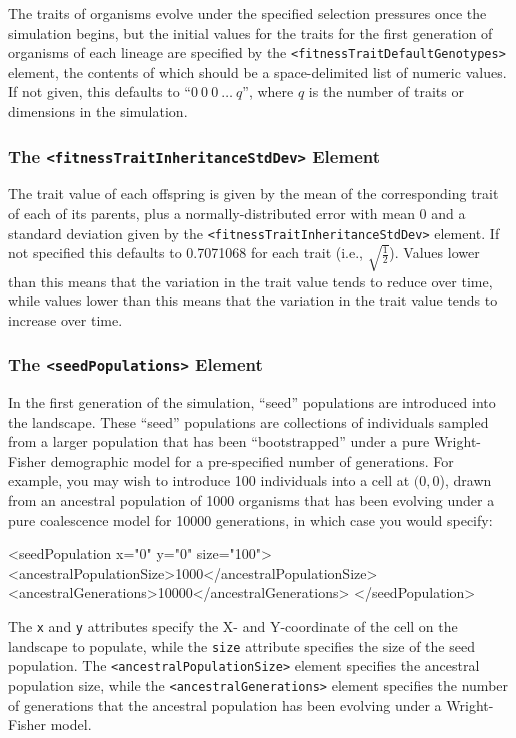 \documentclass[11pt]{article}
\newcommand{\xmlelem}[1]{{\tt<\textcolor{xmlelem}{#1}>}}
\newcommand{\xmlattr}[1]{{\tt\textcolor{xmlattr}{#1}}}
\begin{document}
The traits of organisms evolve under the specified selection pressures once the simulation begins, but the initial values for the traits for the first generation of organisms of each lineage are specified by the \xmlelem{fitnessTraitDefaultGenotypes} element, the contents of which should be a space-delimited list of numeric values.
If not given, this defaults to ``$0 \ 0 \ 0 \ \dots \ q$'', where $q$ is the number of traits or dimensions in the simulation.

\subsubsection{The \xmlelem{fitnessTraitInheritanceStdDev} Element}

The trait value of each offspring is given by the mean of the corresponding trait of each of its parents, plus a normally-distributed error with mean 0 and a standard deviation given by the \xmlelem{fitnessTraitInheritanceStdDev} element.
If not specified this defaults to 0.7071068 for each trait (i.e., $\sqrt{\frac{1}{2}}$).
Values lower than this means that the variation in the trait value tends to reduce over time, while values lower than this means that the variation in the trait value tends to increase over time.

\subsubsection{The \xmlelem{seedPopulations} Element}

In the first generation of the simulation, ``seed'' populations are introduced into the landscape.
These ``seed'' populations are collections of individuals sampled from a larger population that has been ``bootstrapped'' under a pure Wright-Fisher demographic model for a pre-specified number of generations.
For example, you may wish to introduce 100 individuals into a cell at $(0,0$), drawn from an ancestral population of 1000 organisms that has been evolving under a pure coalescence model for 10000 generations, in which case you would specify:

\begin{ginkgoxml}
<seedPopulation x="0" y="0" size="100">
	<ancestralPopulationSize>1000</ancestralPopulationSize>
	<ancestralGenerations>10000</ancestralGenerations>
</seedPopulation>
\end{ginkgoxml}

The \xmlattr{x} and \xmlattr{y} attributes specify the X- and Y-coordinate of the cell on the landscape to populate, while the \xmlattr{size} attribute specifies the size of the seed population.
The \xmlelem{ancestralPopulationSize} element specifies the ancestral population size, while the \xmlelem{ancestralGenerations} element specifies the number of generations that the ancestral population has been evolving under a Wright-Fisher model.
\end{document}
